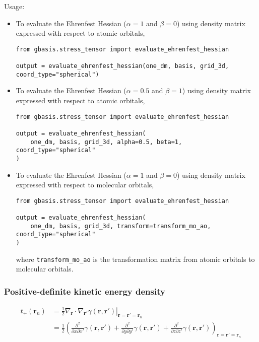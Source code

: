 \documentclass[letterpaper]{article}
\begin{document}
Usage:
\begin{itemize}
\item To evaluate the Ehrenfest Hessian ($\alpha=1$ and $\beta=0$)
  using density matrix expressed with respect to atomic orbitals,
\begin{verbatim}
from gbasis.stress_tensor import evaluate_ehrenfest_hessian

output = evaluate_ehrenfest_hessian(one_dm, basis, grid_3d, coord_type="spherical")
\end{verbatim}
\item To evaluate the Ehrenfest Hessian ($\alpha=0.5$ and $\beta=1$)
  using density matrix expressed with respect to atomic orbitals,
\begin{verbatim}
from gbasis.stress_tensor import evaluate_ehrenfest_hessian

output = evaluate_ehrenfest_hessian(
    one_dm, basis, grid_3d, alpha=0.5, beta=1, coord_type="spherical"
)
\end{verbatim}
\item To evaluate the Ehrenfest Hessian ($\alpha=1$ and $\beta=0$)
  using density matrix expressed with respect to molecular orbitals,
\begin{verbatim}
from gbasis.stress_tensor import evaluate_ehrenfest_hessian

output = evaluate_ehrenfest_hessian(
    one_dm, basis, grid_3d, transform=transform_mo_ao, coord_type="spherical"
)
\end{verbatim}
  where \verb|transform_mo_ao| is the transformation matrix from atomic orbitals
  to molecular orbitals.
\end{itemize}
\subsubsection{Positive-definite kinetic energy density}
\begin{equation}
  \begin{split}
    t_+ (\mathbf{r}_n)
    &= \frac{1}{2} \left.
      \nabla_{\mathbf{r}} \cdot \nabla_{\mathbf{r}'} \gamma(\mathbf{r}, \mathbf{r}')
    \right|_{\mathbf{r} = \mathbf{r}' = \mathbf{r}_n}\\
    &= \frac{1}{2} \left(
      \frac{\partial^2}{\partial x \partial x'} \gamma(\mathbf{r}, \mathbf{r}')
      + \frac{\partial^2}{\partial y \partial y'} \gamma(\mathbf{r}, \mathbf{r}')
      + \frac{\partial^2}{\partial z \partial z'} \gamma(\mathbf{r}, \mathbf{r}')
    \right)_{\mathbf{r} = \mathbf{r}' = \mathbf{r}_n}\\
  \end{split}
\end{equation}
\end{document}
